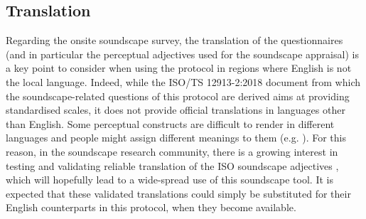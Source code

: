  \subsection{Translation}

   Regarding the onsite soundscape survey, the translation of the questionnaires (and in particular the perceptual adjectives used for the soundscape appraisal) is a key point to consider when using the protocol in regions where English is not the local language. Indeed, while the ISO/TS 12913-2:2018 document from which the soundscape-related questions of this protocol are derived aims at providing standardised scales, it does not provide official translations in languages other than English. Some perceptual constructs are difficult to render in different languages and people might assign different meanings to them (e.g. ). For this reason, in the soundscape research community, there is a growing interest in testing and validating reliable translation of the ISO soundscape adjectives , which will hopefully lead to a wide-spread use of this soundscape tool. It is expected that these validated translations could simply be substituted for their English counterparts in this protocol, when they become available.